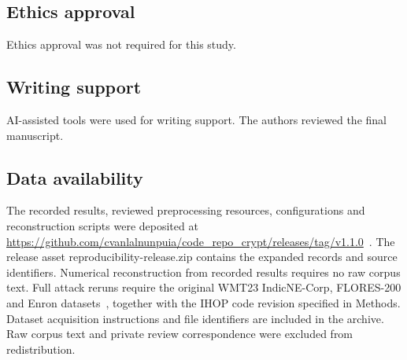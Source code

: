 \documentclass[pdflatex,sn-mathphys-num]{sn-jnl}%
\theoremstyle{thmstyleone}%
\theoremstyle{thmstyletwo}%
\theoremstyle{thmstylethree}%
\begin{document}
\subsection*{Ethics approval}
Ethics approval was not required for this study.

\subsection*{Writing support}
AI-assisted tools were used for writing support. The authors reviewed the final manuscript.

\subsection*{Data availability}
The recorded results, reviewed preprocessing resources, configurations and reconstruction scripts were deposited at \url{https://github.com/cvanlalnunpuia/code_repo_crypt/releases/tag/v1.1.0}~\cite{studydata}. The release asset reproducibility-release.zip contains the expanded records and source identifiers. Numerical reconstruction from recorded results requires no raw corpus text. Full attack reruns require the original WMT23 IndicNE-Corp, FLORES-200 and Enron datasets~\cite{indic,flores,enrondata}, together with the IHOP code revision specified in Methods. Dataset acquisition instructions and file identifiers are included in the archive. Raw corpus text and private review correspondence were excluded from redistribution.


\end{document}
